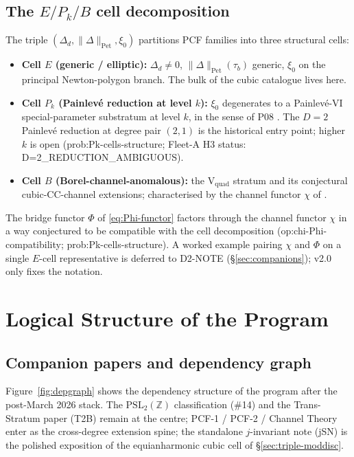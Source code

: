 \documentclass[11pt,a4paper]{article}
\theoremstyle{definition}
\theoremstyle{remark}
\newcommand{\PSLZ}{\mathrm{PSL}_2(\mathbb{Z})}
\newcommand{\PetN}[1]{\lVert #1 \rVert_{\mathrm{Pet}}}
\begin{document}
\subsection{The \texorpdfstring{$E/P_k/B$}{E / P\_k / B} cell decomposition}
\label{sec:triple-cells}

The triple $(\Delta_d, \PetN{\Delta}, \xi_0)$ partitions PCF families
into three structural cells:
\begin{itemize}[leftmargin=2em]
  \item \textbf{Cell $E$ (generic / elliptic):} $\Delta_d \neq 0$,
        $\PetN{\Delta}(\tau_b)$ generic, $\xi_0$ on the principal
        Newton-polygon branch. The bulk of the cubic catalogue lives
        here.
  \item \textbf{Cell $P_k$ (Painlev\'e reduction at level $k$):}
        $\xi_0$ degenerates to a Painlev\'e-VI special-parameter
        substratum at level $k$, in the sense of P08
        \cite{P08}. The $D=2$ Painlev\'e reduction at degree pair
        $(2,1)$ is the historical entry point; higher $k$ is open
        (\textsf{prob:Pk-cells-structure}; Fleet-A H3 status:
        \textsf{D=2\_REDUCTION\_AMBIGUOUS}).
  \item \textbf{Cell $B$ (Borel-channel-anomalous):} the
        V$_{\mathrm{quad}}$ stratum and its conjectural
        cubic-CC-channel extensions; characterised by the channel
        functor $\chi$ of \cite{CT}.
\end{itemize}

The bridge functor $\Phi$ of \eqref{eq:Phi-functor} factors through
the channel functor $\chi$ in a way conjectured to be compatible with
the cell decomposition (\textsf{op:chi-Phi-compatibility};
\textsf{prob:Pk-cells-structure}). A worked example pairing $\chi$
and $\Phi$ on a single $E$-cell representative is deferred to D2-NOTE
(\S\ref{sec:companions}); v2.0 only fixes the notation.

\section{Logical Structure of the Program}
\label{sec:structure}

\subsection{Companion papers and dependency graph}

Figure~\ref{fig:depgraph} shows the dependency structure of the
program after the post-March 2026 stack. The $\PSLZ$ classification
(\#14) and the Trans-Stratum paper (T2B) remain at the centre;
PCF-1 / PCF-2 / Channel Theory enter as the cross-degree extension
spine; the standalone $j$-invariant note (jSN) is the polished
exposition of the equianharmonic cubic cell of \S\ref{sec:triple-moddisc}.
\end{document}
